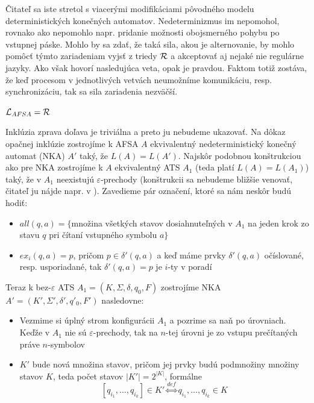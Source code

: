 Čitateľ sa iste stretol s viacerými modifikáciami pôvodného modelu
deterministických konečných automatov. Nedeterminizmus im
nepomohol, rovnako ako nepomohlo napr. pridanie možnosti
obojsmerného pohybu po vstupnej páske. Mohlo by sa zdať, že taká
sila, akou je alternovanie, by mohlo pomôcť týmto zariadeniam
vyjsť z triedy $\mathcal{R}$ a akceptovať aj nejaké nie regulárne
jazyky. Ako však hovorí nasledujúca veta, opak je pravdou. Faktom
totiž zostáva, že keď procesom v jednotlivých vetvách neumožníme
komunikáciu, resp. synchronizáciu, tak sa sila zariadenia
nezväčší.

\begin{veta}
  $\mathcal{L}_{AFSA} = \mathcal{R}$
\end{veta}

\begin{dokaz}
  \label{afsa_r} Inklúzia zprava doľava je triviálna a preto ju
  nebudeme ukazovať. Na dôkaz opačnej inklúzie zostrojíme k AFSA $A$
  ekvivalentný nedeterministický konečný automat (NKA) $A'$ taký, že
  \mbox{$L(A)=L(A')$}. Najskôr podobnou konštrukciou ako pre NKA
  zostrojíme k $A$ ekvivalentný ATS $A_1$ (teda platí $L(A)=L(A_1)$)
  taký, že v $A_1$ neexistujú $\varepsilon$-prechody (konštrukcii sa
  nebudeme bližšie venovať, čitateľ ju nájde napr. v \cite{Hopc}).
  Zavedieme pár označení, ktoré sa nám neskôr budú hodiť:
  \begin{itemize}
    \item $all(q,a)=\{$množina všetkých stavov dosiahnuteľných v $A_1$ na
      jeden krok zo stavu $q$ pri čítaní vstupného symbolu $a\}$
    \item $ex_i(q,a)=p$, pričom $p\in\delta'(q,a)$ a keď máme prvky
      $\delta'(q,a)$ očíslované, resp. usporiadané, tak $\delta'(q,a)=p$
      je $i$-ty v poradí
  \end{itemize}
  Teraz k bez-$\varepsilon$ ATS $A_1=(K,\Sigma,\delta,q_0,F)$
  zostrojíme NKA $A'=(K',\Sigma',\delta',q'_0,F')$ nasledovne:
  \begin{itemize}
    \item Vezmime si úplný strom konfigurácii $A_1$ a pozrime sa naň
      po úrovniach. Keďže v $A_1$ nie sú $\varepsilon$-prechody, tak na
      $n$-tej úrovni je zo vstupu prečítaných práve $n$-symbolov
      \item $K'$ bude nová množina stavov, pričom jej prvky budú podmnožiny
      množiny stavov $K$, teda počet stavov $|K'|=2^{|K|}$, formálne
      \[
      [q_{i_1},\dots,q_{i_k}]\in K'\overset{def}{\Longleftrightarrow}
      q_{i_1},\dots,q_{i_k}\in K
\]
\end{itemize}
\end{dokaz}

